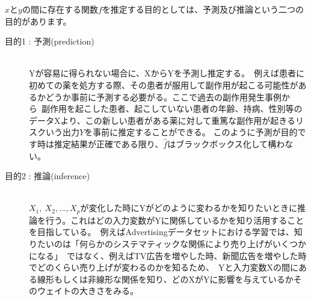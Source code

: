 \documentclass[uplatex]{jsarticle}
\begin{document}
$xとyの間に存在する関数f$を推定する目的としては、予測及び推論という二つの目的があります。
\begin{description}
  \item[目的1 : 予測(prediction)]\mbox{}\\
  Yが容易に得られない場合に、XからYを予測し推定する。\
  例えば患者に初めての薬を処方する際、その患者が服用して副作用が起こる可能性があるかどうか事前に予測する必要がる。ここで過去の副作用発生事例から\
  副作用を起こした患者、起こしていない患者の年齢、持病、性別等のデータXより、この新しい患者がある薬に対して重篤な副作用が起きるリスクいう出力$Y$を事前に推定することができる。
  このように予測が目的です時は推定結果が正確である限り、$\hat{f}$はブラックボックス化して構わない。
  \item[目的2 : 推論(inference)]\mbox{}\\
  $X_1,\ X_2,\dots,X_p$が変化した時にYがどのように変わるかを知りたいときに推論を行う。これはどの入力変数がYに関係しているかを知り活用することを目指している。\
  例えばAdvertisingデータセットにおける学習では、知りたいのは「何らかのシステマティックな関係により売り上げがいくつかになる」\
  ではなく、例えばTV広告を増やした時、新聞広告を増やした時でどのくらい売り上げが変わるのかを知るため、\
  Yと入力変数Xの間にある線形もしくは非線形な関係を知り、どのXがYに影響を与えているかそのウェイトの大きさをみる。
\end{description}
\end{document}
